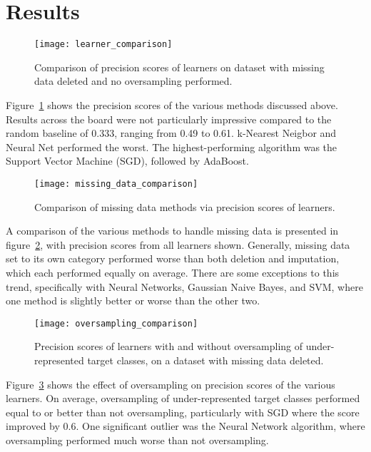 \documentclass[conference]{IEEEtran}
\begin{document}
\section{Results}

\begin{figure}[htpb]
	\centering
	\texttt{[image: learner\_comparison]}
	\caption{Comparison of precision scores of learners on dataset with missing data deleted and no oversampling performed.}
	\label{fig:learner_comp}
\end{figure}

Figure~\ref{fig:learner_comp} shows the precision scores of the various methods discussed above. Results across the board were not particularly impressive compared to the random baseline of 0.333, ranging from 0.49 to 0.61. k-Nearest Neigbor and Neural Net performed the worst. The highest-performing algorithm was the Support Vector Machine (SGD), followed by AdaBoost.

\begin{figure}[htpb]
	\centering
	\texttt{[image: missing\_data\_comparison]}
	\caption{Comparison of missing data methods via precision scores of learners.}
	\label{fig:missing_data_comp}
\end{figure}

A comparison of the various methods to handle missing data is presented in figure~\ref{fig:missing_data_comp}, with precision scores from all learners shown. Generally, missing data set to its own category performed worse than both deletion and imputation, which each performed equally on average. There are some exceptions to this trend, specifically with Neural Networks, Gaussian Naive Bayes, and SVM, where one method is slightly better or worse than the other two.

\begin{figure}[htpb]
	\centering
	\texttt{[image: oversampling\_comparison]}
	\caption{Precision scores of learners with and without oversampling of under-represented target classes, on a dataset with missing data deleted.}
	\label{fig:oversampling_comp}
\end{figure}

Figure~\ref{fig:oversampling_comp} shows the effect of oversampling on precision scores of the various learners. On average, oversampling of under-represented target classes performed equal to or better than not oversampling, particularly with SGD where the score improved by 0.6. One significant outlier was the Neural Network algorithm, where oversampling performed much worse than not oversampling.
\end{document}
